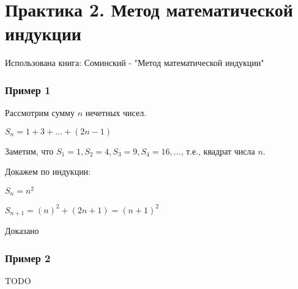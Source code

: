 \section{Практика 2. Метод математической индукции}

Использована книга: Соминский - "Метод математической индукции"

\subsubsection{Пример 1}

Рассмотрим сумму $ n $ нечетных чисел.

$ S_{n} = 1 + 3 + \ldots + (2n-1) $

Заметим, что $ S_{1} = 1, S_{2} = 4, S_{3} = 9, S_{4} = 16, \ldots $, т.е., квадрат числа $ n $.

Докажем по индукции:

$ S_{n} = n^{2} $

$ S_{n+1} = (n)^{2} + (2n + 1) = (n+1)^{2}$

Доказано

\subsubsection{Пример 2}

TODO